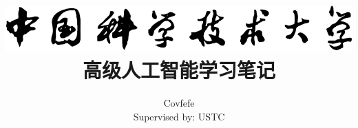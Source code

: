 \usepackage[utf8]{inputenc}
\usepackage{graphicx}
\usepackage[a4paper,width=150mm,top=25mm,bottom=25mm]{geometry}
\usepackage[UTF8]{ctex}
\usepackage{xcolor}  
\usepackage{tikz}
\usepackage{pst-blur}
\usepackage{pstricks-add}
\usepackage{unicode-math}
\usepackage[ruled,linesnumbered]{algorithm2e}
\usepackage{enumitem}
\usetikzlibrary{arrows,shapes,chains}
\usepackage{titlesec}
\titlespacing{\subsubsection}{0pt}{9pt}{-30pt}
\usepackage{hyperref}

\newcommand{\firstchapterurl}{FirstChapter/}
\newcommand{\secondchapterurl}{SecondChapter/}
\newcommand{\thirdchapterurl}{ThirdChapter/}

\graphicspath{{figures/}{FirstChapter/figures/}{SecondChapter/figures/}{ThirdChapter/figures/}}

\title{
    {\includegraphics[]{logo.pdf}}\\
    {高级人工智能学习笔记}
}

\author{Covfefe \\ Supervised by: USTC}

